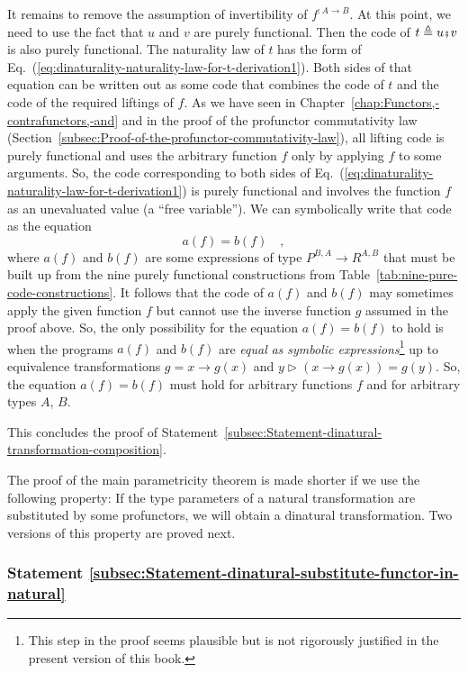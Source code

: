 It remains to remove the assumption of invertibility of $f^{:A\rightarrow B}$.
At this point, we need to use the fact that $u$ and $v$ are purely
functional. Then the code of $t\triangleq u\bef v$ is also purely
functional. The naturality law of $t$ has the form of Eq.~(\ref{eq:dinaturality-naturality-law-for-t-derivation1}).
Both sides of that equation can be written out as some code that combines
the code of $t$ and the code of the required liftings of $f$. As
we have seen in Chapter~\ref{chap:Functors,-contrafunctors,-and}
and in the proof of the profunctor commutativity law (Section~\ref{subsec:Proof-of-the-profunctor-commutativity-law}),
all lifting code is purely functional and uses the arbitrary function
$f$ only by applying $f$ to some arguments. So, the code corresponding
to both sides of Eq.~(\ref{eq:dinaturality-naturality-law-for-t-derivation1})
is purely functional and involves the function $f$ as an unevaluated
value (a ``free variable''). We can symbolically write that code
as the equation 
\[
a(f)=b(f)\quad,
\]
where $a(f)$ and $b(f)$ are some expressions of type $P^{B,A}\rightarrow R^{A,B}$
that must be built up from the nine purely functional constructions
from Table~\ref{tab:nine-pure-code-constructions}. It follows that
the code of $a(f)$ and $b(f)$ may sometimes apply the given function
$f$ but cannot use the inverse function $g$ assumed in the proof
above. So, the only possibility for the equation $a(f)=b(f)$ to hold
is when the programs $a(f)$ and $b(f)$ are \emph{equal} \emph{as
symbolic expressions}\footnote{This step in the proof seems plausible but is not rigorously justified
in the present version of this book.} up to equivalence transformations $g=x\rightarrow g(x)$ and $y\triangleright(x\rightarrow g(x))=g(y)$.
So, the equation $a(f)=b(f)$ must hold for arbitrary functions $f$
and for arbitrary types $A$, $B$. 

This concludes the proof of Statement~\ref{subsec:Statement-dinatural-transformation-composition}.

The proof of the main parametricity theorem is made shorter if we
use the following property: If the type parameters of a natural transformation
are substituted by some profunctors, we will obtain a dinatural transformation.
Two versions of this property are proved next.

\subsubsection{Statement \label{subsec:Statement-dinatural-substitute-functor-in-natural}\ref{subsec:Statement-dinatural-substitute-functor-in-natural}}

